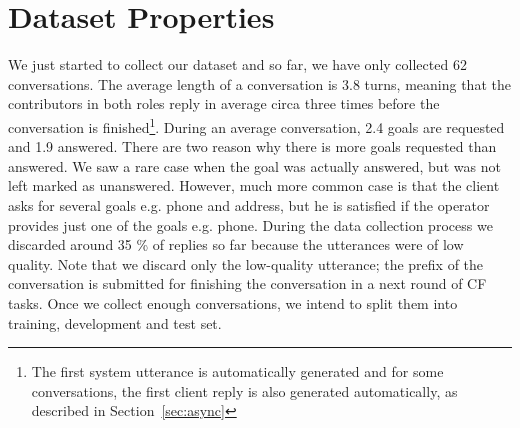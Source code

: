 \documentclass[runningheads,a4paper]{llncs}
\def\OP#1{#1}  %
\begin{document}
\section{Dataset Properties} \label{sec:props}
\vspace{-0.50em}
We just started to collect our dataset and so far, we have only collected \OP{62} conversations.
The average length of a conversation is \OP{3.8} turns, meaning that the contributors in both roles reply in average circa three times before the conversation is finished\footnote{The first system utterance is automatically generated and for some conversations, the first client reply is also generated automatically, as described in Section~\ref{sec:async}}.
During an average conversation, \OP{2.4} goals are requested and \OP{1.9} answered.
There are two reason why there is more goals requested than answered.
We saw a rare case when the goal was actually answered, but was not left marked as unanswered.
However, much more common case is that the client asks for several goals e.g. phone and address, but he is satisfied if the operator provides just one of the goals e.g. phone. 
During the data collection process we discarded around \OP{35} \% of replies so far because the utterances were of low quality.
Note that we discard only the low-quality utterance; the prefix of the conversation is submitted for finishing the conversation in a next round of CF tasks.
Once we collect enough conversations, we intend to split them into training, development and test set. %
\end{document}
